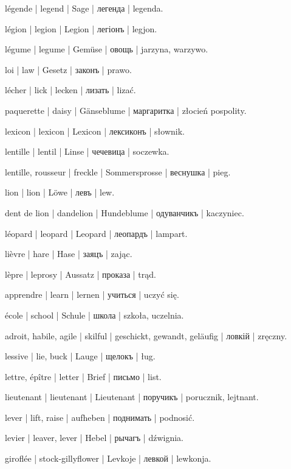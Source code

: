 \begin{outdent}{1em}
légende | legend | Sage | легенда | legenda.

légion | legion | Legion | легіонъ | legjon.

légume | legume | Gemüse | овощь | jarzyna, warzywo.

loi | law | Gesetz | законъ | prawo.

lécher | lick | lecken | лизать | lizać.

paquerette | daisy | Gänseblume | маргаритка | złocień pospolity.

lexicon | lexicon | Lexicon | лексиконъ | słownik.

lentille | lentil | Linse | чечевица | soczewka.

lentille, rousseur | freckle | Sommersprosse | веснушка | pieg.

lion | lion | Löwe | левъ | lew.

dent de lion | dandelion | Hundeblume | одуванчикъ | kaczyniec.

léopard | leopard | Leopard | леопардъ | lampart.

lièvre | hare | Hase | заяцъ | zając.

lèpre | leprosy | Aussatz | проказа | trąd.

apprendre | learn | lernen | учиться | uczyć się.

\uvsubentry{}
école | school | Schule | школа | szkoła, uczelnia.

adroit, habile, agile | skilful | geschickt, gewandt, geläufig | ловкій | zręczny.

lessive | lie, buck | Lauge | щелокъ | ług.

lettre, épître | letter | Brief | письмо | list.

lieutenant | lieutenant | Lieutenant | поручикъ | porucznik, lejtnant.

lever | lift, raise | aufheben | поднимать | podnosić.

\uvsubentry{}
levier | leaver, lever | Hebel | рычагъ | dźwignia.

giroflée | stock-gillyflower | Levkoje | левкой | lewkonja.


\end{outdent}
